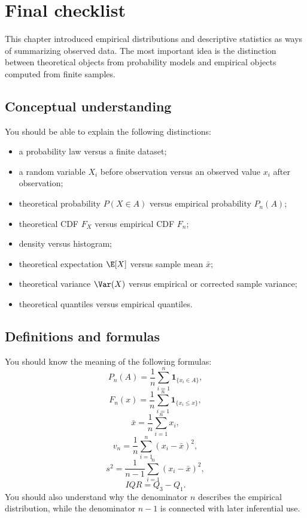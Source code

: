 \section{Final checklist}

This chapter introduced empirical distributions and descriptive statistics as
ways of summarizing observed data. The most important idea is the distinction
between theoretical objects from probability models and empirical objects
computed from finite samples.

\subsection*{Conceptual understanding}

You should be able to explain the following distinctions:
\begin{itemize}
    \item a probability law versus a finite dataset;
    \item a random variable \(X_i\) before observation versus an observed value
    \(x_i\) after observation;
    \item theoretical probability \(P(X\in A)\) versus empirical probability
    \(P_n(A)\);
    \item theoretical CDF \(F_X\) versus empirical CDF \(F_n\);
    \item density versus histogram;
    \item theoretical expectation \(\E[X]\) versus sample mean \(\bar{x}\);
    \item theoretical variance \(\Var(X)\) versus empirical or corrected sample
    variance;
    \item theoretical quantiles versus empirical quantiles.
\end{itemize}

\subsection*{Definitions and formulas}

You should know the meaning of the following formulas:
\[
P_n(A)=\frac1n\sum_{i=1}^n\mathbf{1}_{\{x_i\in A\}},
\]
\[
F_n(x)=\frac1n\sum_{i=1}^n\mathbf{1}_{\{x_i\leq x\}},
\]
\[
\bar{x}=\frac1n\sum_{i=1}^n x_i,
\]
\[
v_n=\frac1n\sum_{i=1}^n(x_i-\bar{x})^2,
\]
\[
s^2=\frac1{n-1}\sum_{i=1}^n(x_i-\bar{x})^2,
\]
\[
IQR=Q_3-Q_1.
\]
You should also understand why the denominator \(n\) describes the empirical
distribution, while the denominator \(n-1\) is connected with later inferential
use.

